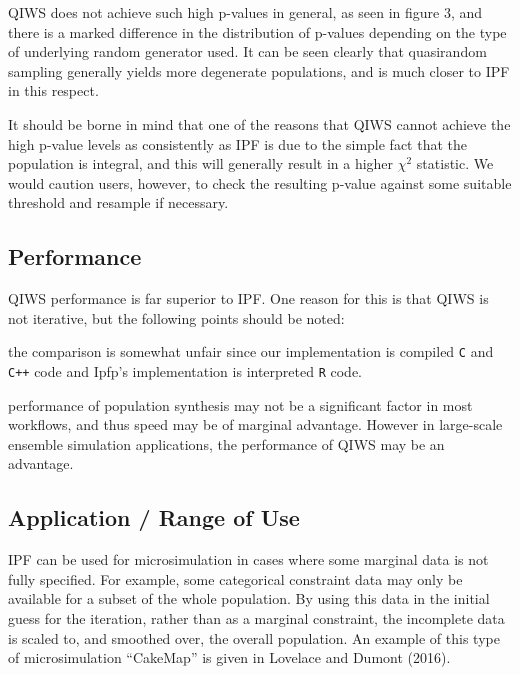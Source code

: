 \documentclass{JASSS}
\begin{document}
QIWS does not achieve such high p-values in general, as seen in figure
3, and there is a marked difference in the distribution of p-values
depending on the type of underlying random generator used. It can be
seen clearly that quasirandom sampling generally yields more degenerate
populations, and is much closer to IPF in this respect.

It should be borne in mind that one of the reasons that QIWS cannot
achieve the high p-value levels as consistently as IPF is due to the
simple fact that the population is integral, and this will generally
result in a higher \(\chi^2\) statistic. We would caution users,
however, to check the resulting p-value against some suitable threshold
and resample if necessary.

\subsection{Performance}\label{performance-1}

QIWS performance is far superior to IPF. One reason for this is that
QIWS is not iterative, but the following points should be noted:

\begin{itemize*}
\item
  the comparison is somewhat unfair since our implementation is compiled
  \texttt{C} and \texttt{C++} code and Ipfp's implementation is
  interpreted \texttt{R} code.
\item
  performance of population synthesis may not be a significant factor in
  most workflows, and thus speed may be of marginal advantage. However
  in large-scale ensemble simulation applications, the performance of
  QIWS may be an advantage.
\end{itemize*}

\subsection{Application / Range of Use}\label{application-range-of-use}

IPF can be used for microsimulation in cases where some marginal data is
not fully specified. For example, some categorical constraint data may
only be available for a subset of the whole population. By using this
data in the initial guess for the iteration, rather than as a marginal
constraint, the incomplete data is scaled to, and smoothed over, the
overall population. An example of this type of microsimulation
``CakeMap'' is given in Lovelace and Dumont (2016).
\end{document}
